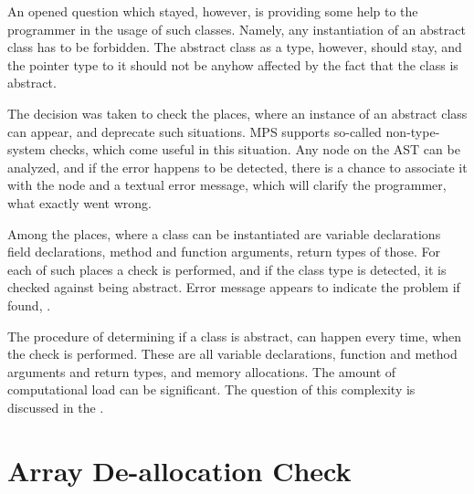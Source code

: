 
An opened question which stayed, however, is providing some help to the programmer in the usage of such classes. Namely, any instantiation
of an abstract class has to be forbidden. The abstract class as a type, however, should stay, and the pointer type to it should not
be anyhow affected by the fact that the class is abstract.

The decision was taken to check the places, where an instance of an abstract class can appear, and deprecate such situations.
MPS supports so-called non-type-system checks, which come useful in this situation. Any node on the AST can be analyzed, and 
if the error happens to be detected, there is a chance to associate it with the node and a textual error message, which will
clarify the programmer, what exactly went wrong. 

Among the places, where a class can be instantiated are variable declarations field declarations, method and function arguments,
return types of those. For each of such places a check is performed, and if the class type is detected, it is checked against
being abstract. Error message appears to indicate the problem if found, . 

The procedure of determining if a class is abstract, can happen every time, when the check is performed. These are all 
variable declarations, function and method arguments and return types, and memory allocations. The amount of computational
load can be significant. The question of this complexity is discussed in the .


\section{Array De-allocation Check}



